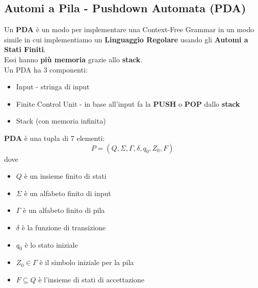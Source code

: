 \documentclass[12pt]{article}
\begin{document}
\subsection{Automi a Pila - Pushdown Automata (PDA)}
Un \textbf{PDA} è un modo per implementare una Context-Free Grammar in un modo simile in cui implementiamo un \textbf{Linguaggio Regolare} usando gli \textbf{Automi a Stati Finiti}.\\
Essi hanno \textbf{più memoria} grazie allo \textbf{stack}.\\
Un PDA ha 3 componenti:
\begin{itemize}
    \item Input - stringa di input
    \item Finite Control Unit - in base all'input fa la \textbf{PUSH} o \textbf{POP} dallo \textbf{stack}
    \item Stack (con memoria infinita)
\end{itemize}
\textbf{PDA} è una tupla di 7 elementi:
\begin{equation*}
    P=(Q,\Sigma,\Gamma,\delta,q_0,Z_0,F)
\end{equation*}
dove
\begin{itemize}
    \item $Q$ è un insieme finito di stati
    \item $\Sigma$ è un alfabeto finito di input
    \item $\Gamma$ è un alfabeto finito di pila
    \item $\delta$ è la funzione di transizione
    \item $q_0$ è lo stato iniziale
    \item $Z_0 \in \Gamma$ è il simbolo iniziale per la pila
    \item $F \subseteq Q$ è l'insieme di stati di accettazione  
\end{itemize}
\end{document}
